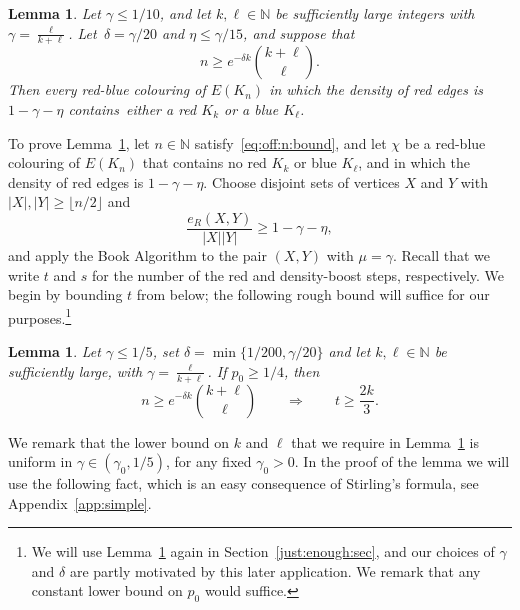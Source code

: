 \documentclass[12pt,reqno]{amsart}
\newtheorem{lemma}[theorem]{Lemma}
\theoremstyle{definition}
\theoremstyle{remark}
\newcommand\N{\mathbb{N}}
\renewcommand{\le}{\leqslant}
\renewcommand{\ge}{\geqslant}
\def\N{\mathbb{N}}
\begin{document}

\begin{lemma}\label{lem:off:diagonal:weak}
Let $\gamma \le 1/10$, and let $k,\ell \in \N$ be sufficiently large integers with $\gamma = \frac{\ell}{k+\ell}$. Let~$\delta = \gamma/20$ and $\eta \le \gamma/15$, and suppose that
\begin{equation}\label{eq:off:n:bound}
n \ge e^{-\delta k} {k + \ell \choose \ell}.
\end{equation}
Then every red-blue colouring of\/ $E(K_n)$ in which the density of red edges is\/ $1 - \gamma - \eta$ contains~either a red $K_k$ or a blue $K_\ell$. 
\end{lemma}

To prove Lemma~\ref{lem:off:diagonal:weak}, let $n \in \N$ satisfy~\eqref{eq:off:n:bound}, and let $\chi$ be a red-blue colouring of $E(K_n)$ that contains no red $K_k$ or blue $K_\ell$, and in which the density of red edges is $1 - \gamma - \eta$. Choose disjoint sets of vertices $X$ and $Y$ with $|X|,|Y| \ge \lfloor n/2 \rfloor$ and 
\begin{equation}\label{off:diag:weak:start:density}
\frac{e_R(X,Y)}{|X||Y|} \ge 1 - \gamma - \eta,
\end{equation}
and apply the Book Algorithm to the pair $(X,Y)$ with $\mu = \gamma$. Recall that we write $t$ and $s$  for the number of the red and density-boost steps, respectively. We begin by bounding $t$ from below; the following rough bound will suffice for our purposes.\footnote{We will use Lemma~\ref{lem:t:big} again in Section~\ref{just:enough:sec}, and our choices of $\gamma$ and $\delta$ are partly motivated by this later application. We remark that any constant lower bound on $p_0$ would suffice.} %

\begin{lemma}\label{lem:t:big}
Let\/ $\gamma \le 1/5$, set\/ $\delta = \min\big\{ 1/200, \gamma/20 \big\}$ and let $k,\ell \in \N$ be sufficiently large, with $\gamma = \frac{\ell}{k+\ell}$. If\/ $p_0 \ge 1/4$, then 
$$n \ge e^{- \delta k} {k + \ell \choose \ell} \qquad \Rightarrow \qquad t \ge \frac{2k}{3}.$$
\end{lemma}

We remark that the lower bound on $k$ and $\ell$ that we require in Lemma~\ref{lem:t:big} is uniform in $\gamma \in (\gamma_0,1/5)$, for any fixed $\gamma_0 > 0$. In the proof of the lemma %
we will use the following fact, which is an easy consequence of Stirling's formula, see Appendix~\ref{app:simple}.
\end{document}
